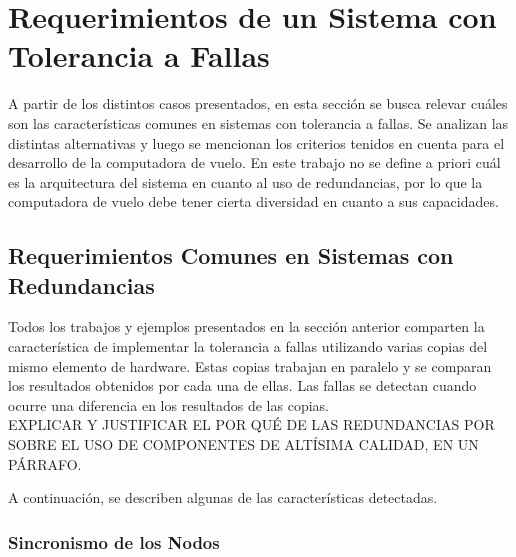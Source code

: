 \section{Requerimientos de un Sistema con Tolerancia a Fallas}

A partir de los distintos casos presentados, en esta sección se busca relevar cuáles son las características comunes en sistemas con tolerancia a fallas. Se analizan las distintas alternativas y luego se mencionan los criterios tenidos en cuenta para el desarrollo de la computadora de vuelo. En este trabajo no se define a priori cuál es la arquitectura del sistema en cuanto al uso de redundancias, por lo que la computadora de vuelo debe tener cierta diversidad en cuanto a sus capacidades.\\

\subsection{Requerimientos Comunes en Sistemas con Redundancias}

Todos los trabajos y ejemplos presentados en la sección anterior comparten la característica de implementar la tolerancia a fallas utilizando varias copias del mismo elemento de hardware. Estas copias trabajan en paralelo y se comparan los resultados obtenidos por cada una de ellas. Las fallas se detectan cuando ocurre una diferencia en los resultados de las copias.\\

{\color{red} EXPLICAR Y JUSTIFICAR EL POR QUÉ DE LAS REDUNDANCIAS POR SOBRE EL USO DE COMPONENTES DE ALTÍSIMA CALIDAD, EN UN PÁRRAFO.}

A continuación, se describen algunas de las características detectadas.

\subsubsection{Sincronismo de los Nodos}


